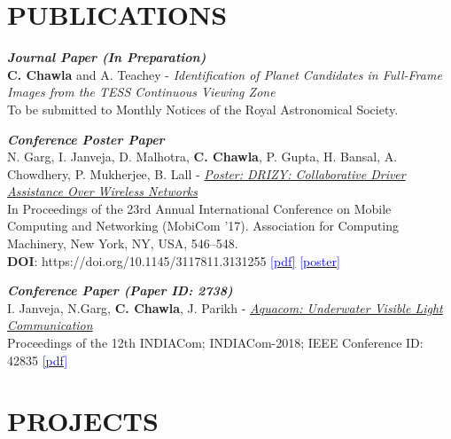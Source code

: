 \documentclass[11pt]{res} %
\newcommand{\titlegap}{5pt} %
\begin{document}
\begin{resume}
\section{\large PUBLICATIONS}

\vspace{\titlegap}


\textbullet{} \textbf{\textit{Journal Paper (In Preparation)}}\\
\textbf{C. Chawla} and A. Teachey - \textit{Identification of Planet Candidates in Full-Frame Images from the TESS Continuous Viewing Zone}\\
To be submitted to Monthly Notices of the Royal Astronomical Society.

\textbullet{} \textbf{\textit{Conference Poster Paper}}\\ 
N. Garg, I. Janveja, D. Malhotra, \textbf{C. Chawla}, P. Gupta, H. Bansal, A. Chowdhery, P. Mukherjee, B. Lall - \textcolor{blue}{\textit{\href{https://dl.acm.org/doi/10.1145/3117811.3131255}{Poster: DRIZY: Collaborative Driver Assistance Over Wireless Networks}}}\\
In Proceedings of the 23rd Annual International Conference on Mobile Computing and Networking (MobiCom '17). Association for Computing Machinery, New York, NY, USA, 546–548.\\
\textbf{DOI}: https://doi.org/10.1145/3117811.3131255 \hfill \href{https://drive.google.com/file/d/1SKX32RrcdYj5FT_NZexk6U-bRMg0f61e/view}{\textcolor{blue}{[pdf]}} \href{https://drive.google.com/file/d/1KqTpAvrwtumLvsuGCr1nNg1oRxdMLvOv/view}{\textcolor{blue}{[poster]}}

\textbullet{} \textbf{\textit{Conference Paper (Paper ID: 2738)}}\\ 
I. Janveja, N.Garg, \textbf{C. Chawla}, J. Parikh - \textcolor{blue}{\textit{\href{http://bvicam.in/INDIACom/news/INDIACom\%202018\%20Proceedings/Main/papers.html}{Aquacom: Underwater Visible Light Communication}}}\\
Proceedings of the 12th INDIACom; INDIACom-2018; IEEE Conference ID: 42835 \hfill \href{http://bvicam.in/INDIACom/news/INDIACom\%202018\%20Proceedings/Main/papers/2738.pdf}{\textcolor{blue}{[pdf]}}
\vspace{0.1in} 
\hline



\section{PROJECTS}
\vspace{0.25in}
\begin{itemize}
    

\end{itemize}
\end{resume}
\end{document}
